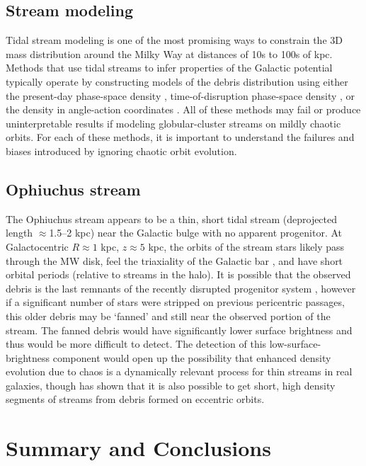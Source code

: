 \documentclass[letterpaper,12pt,preprint]{aastex}
\newcommand{\chchchanges}[1]{{\color{red} {#1}}}
\begin{document}
\subsection{Stream modeling}

Tidal stream modeling is one of the most promising ways to constrain the 3D mass distribution around the Milky Way at distances of 10s to 100s of kpc. Methods that use tidal streams to infer properties of the Galactic potential typically operate by constructing models of the debris distribution using either the present-day phase-space density \citep[e.g.,][]{varghese11, kuepper12, kuepper15, gibbons14}, time-of-disruption phase-space density \citep{apw13, apw14}, or the density in angle-action coordinates \citep{sanders14, bovy14}. All of these methods may fail or produce uninterpretable results if modeling globular-cluster streams on mildly chaotic orbits. For each of these methods, it is important to understand the failures and biases introduced by ignoring chaotic orbit evolution.

\subsection{Ophiuchus stream}

The Ophiuchus stream \citep{bernard14, sesar15} appears to be a thin, short tidal stream (deprojected length $\approx$1.5--2 kpc) near the Galactic bulge with no apparent progenitor. At Galactocentric $R \approx 1$ kpc, $z \approx 5$ kpc, the orbits of the stream stars likely pass through the MW disk, feel the triaxiality of the Galactic bar \citep[e.g.,][]{wegg13, wegg15}, and have short orbital periods (relative to streams in the halo). It is possible that the observed debris is the last remnants of the recently disrupted progenitor system \citep{sesar15}, however if a significant number of stars were \chchchanges{stripped} on previous pericentric passages, this older debris may be `fanned' and still near the observed portion of the stream. \chchchanges{The fanned debris would have significantly lower surface brightness and thus would be more difficult to detect.} The detection of this low-surface-brightness component would open up the possibility that enhanced density evolution due to chaos is a dynamically relevant process for thin streams in real galaxies, though \cite{carlberg15} has shown that it is also possible to get short, high density segments of streams from debris formed on eccentric orbits.

\section{Summary and Conclusions}\label{sec:conclusions}
\end{document}
